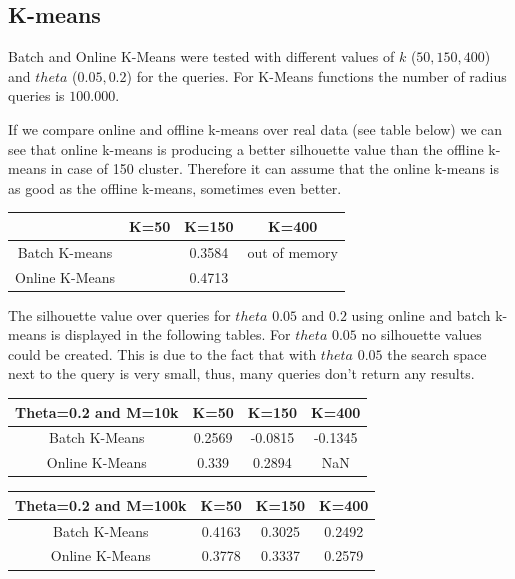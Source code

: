\documentclass{lmproj}
\begin{document}
\subsection{K-means}
Batch and Online K-Means were tested with different values of $k$ ($50,150,400$) and $theta$ ($0.05,0.2$) for the queries. For K-Means functions the number of radius queries is $100.000$.

If we compare online and offline k-means over real data (see table below) we can see that online k-means is producing a better silhouette value than the offline k-means in case of 150 cluster. Therefore it can assume that the online k-means is as good as the offline k-means, sometimes even better.

\begin{center}
 \label{table1}
\begin{tabular}{|c|c|c|c|}
	\hline  & K=50 & K=150 & K=400 \\ 
	\hline Batch K-means &  & 0.3584 & out of memory \\ 
	\hline Online K-Means &  & 0.4713 &  \\ 
	\hline 
\end{tabular} 
\end{center}

The silhouette value over queries for $theta$ $0.05$ and $0.2$ using online and batch k-means is displayed in the following tables. For $theta$ $0.05$ no silhouette values could be created. This is due to the fact that with $theta$ $0.05$ the search space next to the query is very small, thus, many queries don't return any results. 

\begin{center}
 \label{table2}
\begin{tabular}{|c|c|c|c|}
	\hline Theta=0.2 and M=10k & K=50 & K=150 & K=400 \\ 
	\hline Batch K-Means & 0.2569 & -0.0815  & -0.1345  \\ 
	\hline Online K-Means & 0.339 & 0.2894 & NaN \\ 
	\hline 
\end{tabular}
\end{center}

\begin{center}
 \label{table3}
\begin{tabular}{|c|c|c|c|}
	\hline Theta=0.2 and M=100k & K=50 & K=150 & K=400 \\ 
	\hline Batch K-Means & 0.4163 & 0.3025  & 0.2492  \\ 
	\hline Online K-Means & 0.3778 & 0.3337 & 0.2579 \\ 
	\hline 
\end{tabular} 
\end{center}
\end{document}
